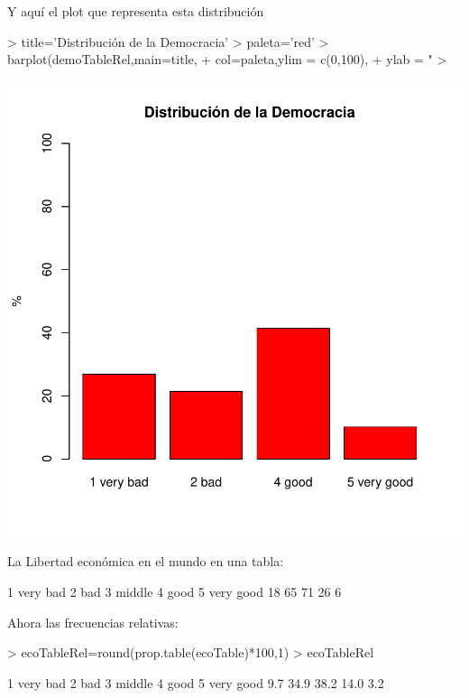 \documentclass{article}
\begin{document}
Y aquí el plot que representa esta distribución
\begin{Schunk}
\begin{Sinput}
> title='Distribución de la Democracia'
> paleta='red'
> barplot(demoTableRel,main=title,
+         col=paleta,ylim = c(0,100),
+         ylab = "%
> 
\end{Sinput}
\end{Schunk}
\includegraphics{paperVersion_0-demoTableRelPlot}


La Libertad económica en el mundo en una tabla:
\begin{Schunk}
\begin{Soutput}
 1 very bad       2 bad    3 middle      4 good 5 very good 
         18          65          71          26           6 
\end{Soutput}
\end{Schunk}


Ahora las frecuencias relativas:
\begin{Schunk}
\begin{Sinput}
> ecoTableRel=round(prop.table(ecoTable)*100,1)
> ecoTableRel
\end{Sinput}
\begin{Soutput}
 1 very bad       2 bad    3 middle      4 good 5 very good 
        9.7        34.9        38.2        14.0         3.2 
\end{Soutput}
\end{Schunk}
\end{document}

